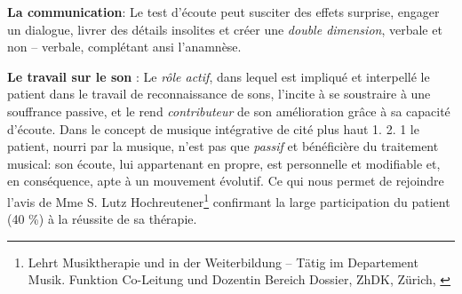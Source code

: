 



\textbf{La communication}:
Le test d'écoute
  peut susciter des effets surprise, engager un dialogue, livrer des détails
 insolites et créer une \textit{double dimension}, verbale et
 non -- verbale, complétant ansi l'anamnèse.



 \textbf{Le travail sur le son} :
 Le \emph{rôle actif}, dans lequel est impliqué et interpellé le patient dans le travail
de reconnaissance de sons, l'incite à se soustraire à une souffrance
passive, et  le rend  \textit{contributeur} de son amélioration grâce à sa capacité
d'écoute.
Dans le concept de musique intégrative de \autocite[Cf.]
        {vrait_musicotherapie_2018} cité plus haut 1. 2. 1  le patient, nourri par
        la musique, n'est pas que \textit{passif }et
        bénéficière du traitement musical: son écoute, lui
        appartenant en propre, est personnelle et modifiable %
        et, en conséquence, apte à un mouvement évolutif.
Ce qui nous permet de rejoindre l'avis de Mme S. Lutz
 Hochreutener\footnote{Lehrt Musiktherapie und in der Weiterbildung – Tätig
 im Departement Musik. Funktion Co-Leitung und Dozentin Bereich
  Dossier, ZhDK, Zürich, \autocite {lutz_hochreutener_spiel_2009} }
 confirmant la large participation du patient (40 \%) à la réussite de sa thérapie.




